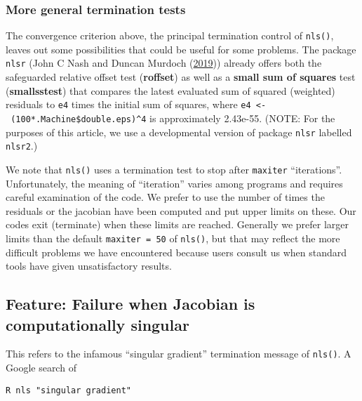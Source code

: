\documentclass[
]{article}
\begin{document}
\hypertarget{more-general-termination-tests}{%
\subsubsection{More general termination
tests}\label{more-general-termination-tests}}

The convergence criterion above, the principal termination control of
\texttt{nls()}, leaves out some possibilities that could be useful for
some problems. The package \texttt{nlsr} (John C Nash and Duncan Murdoch
(\protect\hyperlink{ref-nlsr2019manual}{2019})) already offers both the
safeguarded relative offset test (\textbf{roffset}) as well as a
\textbf{small sum of squares} test (\textbf{smallsstest}) that compares
the latest evaluated sum of squared (weighted) residuals to \texttt{e4}
times the initial sum of squares, where
\texttt{e4\ \textless{}-\ (100*.Machine\$double.eps)\^{}4} is
approximately 2.43e-55. (NOTE: For the purposes of this article, we use
a developmental version of package \texttt{nlsr} labelled
\texttt{nlsr2}.)

We note that \texttt{nls()} uses a termination test to stop after
\texttt{maxiter} ``iterations''. Unfortunately, the meaning of
``iteration'' varies among programs and requires careful examination of
the code. We prefer to use the number of times the residuals or the
jacobian have been computed and put upper limits on these. Our codes
exit (terminate) when these limits are reached. Generally we prefer
larger limits than the default \texttt{maxiter\ =\ 50} of
\texttt{nls()}, but that may reflect the more difficult problems we have
encountered because users consult us when standard tools have given
unsatisfactory results.

\hypertarget{feature-failure-when-jacobian-is-computationally-singular}{%
\subsection{Feature: Failure when Jacobian is computationally
singular}\label{feature-failure-when-jacobian-is-computationally-singular}}

This refers to the infamous ``singular gradient'' termination message of
\texttt{nls()}. A Google search of

\begin{verbatim}
R nls "singular gradient"
\end{verbatim}
\end{document}
